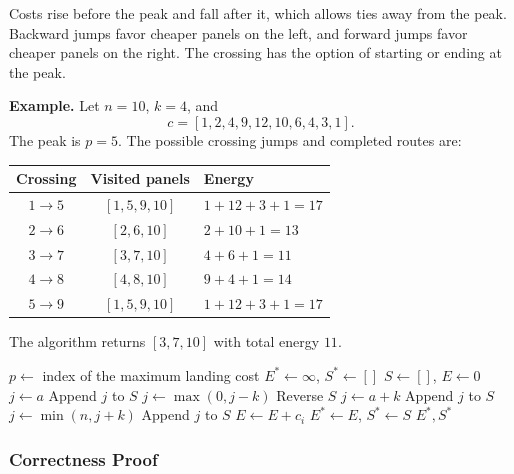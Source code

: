 \documentclass{article}
\begin{document}
Costs rise before the peak and fall after it, which allows ties away from the peak. Backward jumps favor cheaper panels on the left, and forward jumps favor cheaper panels on the right. The crossing has the option of starting or ending at the peak.

\medskip
\noindent\textbf{Example.} Let $n=10$, $k=4$, and
\[
c=[1,2,4,9,12,10,6,4,3,1].
\]
The peak is $p=5$. The possible crossing jumps and completed routes are:
\begin{center}
\begin{tabular}{ccl}
\textbf{Crossing} & \textbf{Visited panels} & \textbf{Energy} \\
\hline
$1\to5$ & $[1,5,9,10]$ & $1+12+3+1=17$ \\
$2\to6$ & $[2,6,10]$ & $2+10+1=13$ \\
$3\to7$ & $[3,7,10]$ & $4+6+1=11$ \\
$4\to8$ & $[4,8,10]$ & $9+4+1=14$ \\
$5\to9$ & $[1,5,9,10]$ & $1+12+3+1=17$
\end{tabular}
\end{center}
The algorithm returns $[3,7,10]$ with total energy $11$.

\begin{algorithm}[H]
\caption{Greedy Completions for ProblemS2}
\label{alg:s2}
\begin{algorithmic}[1]
    \State $p\gets$ index of the maximum landing cost
    \State $E^*\gets\infty$, $S^*\gets []$ 
        \State $S\gets []$, $E\gets0$ 
        \State $j\gets a$
            \State Append $j$ to $S$
            \State $j\gets\max(0,j-k)$
        \EndWhile
        \State Reverse $S$
        \State $j\gets a+k$
        \State Append $j$ to $S$
            \State $j\gets\min(n,j+k)$
            \State Append $j$ to $S$
        \EndWhile
            \State $E\gets E+c_i$
        \EndFor
            \State $E^*\gets E$, $S^*\gets S$
        \EndIf
    \EndFor
    \State \Return $E^*,S^*$
\EndProcedure
\end{algorithmic}
\end{algorithm}

\subsubsection{Correctness Proof}
\end{document}

